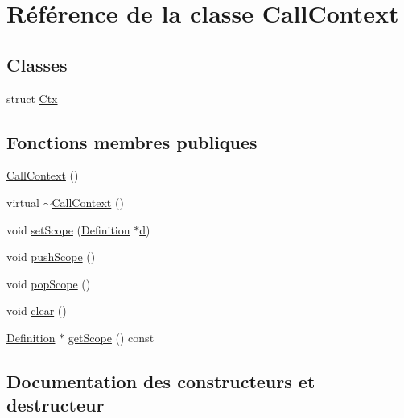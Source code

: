 \hypertarget{class_call_context}{}\section{Référence de la classe Call\+Context}
\label{class_call_context}
\subsection*{Classes}
\begin{DoxyCompactItemize}
\item 
struct \hyperlink{struct_call_context_1_1_ctx}{Ctx}
\end{DoxyCompactItemize}
\subsection*{Fonctions membres publiques}
\begin{DoxyCompactItemize}
\item 
\hyperlink{class_call_context_acf102c125585ad2e1bbfd53f71bdf736}{Call\+Context} ()
\item 
virtual \hyperlink{class_call_context_ae5563a01e60de29b7eedd1b85fe2182c}{$\sim$\+Call\+Context} ()
\item 
void \hyperlink{class_call_context_a35a22e5fec83ba7f06331797ec21ca04}{set\+Scope} (\hyperlink{class_definition}{Definition} $\ast$\hyperlink{060__command__switch_8tcl_af43f4b1f0064a33b2d662af9f06d3a00}{d})
\item 
void \hyperlink{class_call_context_a78cc7e558f44a4a7057bbc87da205f30}{push\+Scope} ()
\item 
void \hyperlink{class_call_context_ab2e212ecf1eaa4a62e551ede844d1ff1}{pop\+Scope} ()
\item 
void \hyperlink{class_call_context_a7869d538aef25757711715bbd042ab62}{clear} ()
\item 
\hyperlink{class_definition}{Definition} $\ast$ \hyperlink{class_call_context_a53183492f8d996b714da9eab6be7a8c3}{get\+Scope} () const 
\end{DoxyCompactItemize}


\subsection{Documentation des constructeurs et destructeur}
\hypertarget{class_call_context_acf102c125585ad2e1bbfd53f71bdf736}{}
